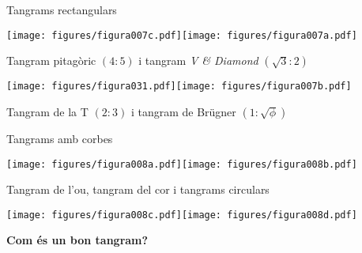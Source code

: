 \documentclass[14pt]{beamer}
\begin{document}
    \begin{frame}{Tangrams rectangulars}
        \begin{center}
            \texttt{[image: figures/figura007c.pdf]}\qquad\quad\texttt{[image: figures/figura007a.pdf]}\;\;\phantom{.} \\

            \bigskip
            
            Tangram pitagòric $(4\!\!:\!\!5)$ i tangram \emph{V \& Diamond} $(\sqrt{3}\!\!:\!\!2)$\\

            \bigskip

            \texttt{[image: figures/figura031.pdf]}\qquad\texttt{[image: figures/figura007b.pdf]}\;\;\phantom{.}\\

            \bigskip
            
            Tangram de la T $(2\!\!:\!\!3)$ i tangram de Brügner $(1\!\!:\!\!\sqrt{\phi})$\\
        \end{center}
    \end{frame}

    \begin{frame}{Tangrams amb corbes}
        \begin{center}
            \texttt{[image: figures/figura008a.pdf]}\qquad\qquad\texttt{[image: figures/figura008b.pdf]}\\

            \medskip
            
            Tangram de l'ou, tangram del cor i tangrams circulars

            \bigskip

            \texttt{[image: figures/figura008c.pdf]}\qquad\qquad\texttt{[image: figures/figura008d.pdf]} \\
        \end{center}
    \end{frame}


    \begin{frame}{}
        \begin{center}
            \textbf{\Large Com és un bon tangram?}
        \end{center}
    \end{frame}
\end{document}
